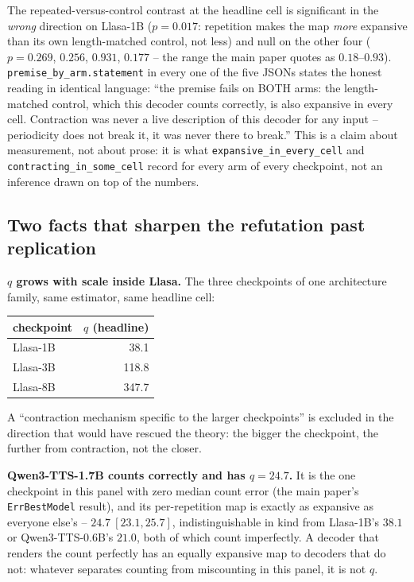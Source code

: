 \documentclass[11pt]{article}
\begin{document}
The repeated-versus-control contrast at the headline cell is significant in
the \emph{wrong} direction on Llasa-1B ($p=0.017$: repetition makes the map
\emph{more} expansive than its own length-matched control, not less) and null
on the other four ($p=0.269$, $0.256$, $0.931$, $0.177$ -- the range the main
paper quotes as $0.18$--$0.93$). \texttt{premise\_by\_arm.statement} in every
one of the five JSONs states the honest reading in identical language: ``the
premise fails on BOTH arms: the length-matched control, which this decoder
counts correctly, is also expansive in every cell. Contraction was never a
live description of this decoder for any input -- periodicity does not break
it, it was never there to break.'' This is a claim about measurement, not
about prose: it is what \texttt{expansive\_in\_every\_cell} and
\texttt{contracting\_in\_some\_cell} record for every arm of every checkpoint,
not an inference drawn on top of the numbers.

\subsection{Two facts that sharpen the refutation past replication}
\label{sec:s5-jacobian-scale}

\noindent\textbf{$q$ grows with scale inside Llasa.} The three checkpoints of
one architecture family, same estimator, same headline cell:

\begin{center}
\begin{tabular}{lr}
\toprule
checkpoint & $q$ (headline) \\
\midrule
Llasa-1B & 38.1 \\
Llasa-3B & 118.8 \\
Llasa-8B & 347.7 \\
\bottomrule
\end{tabular}
\end{center}

A ``contraction mechanism specific to the larger checkpoints'' is excluded in
the direction that would have rescued the theory: the bigger the checkpoint,
the further from contraction, not the closer.

\noindent\textbf{Qwen3-TTS-1.7B counts correctly and has $q=24.7$.} It is the
one checkpoint in this panel with zero median count error (the main paper's
\texttt{ErrBestModel} result), and its per-repetition map is exactly as
expansive as everyone else's -- $24.7\ [23.1,25.7]$, indistinguishable in kind
from Llasa-1B's $38.1$ or Qwen3-TTS-0.6B's $21.0$, both of which count
imperfectly. A decoder that renders the count perfectly has an equally
expansive map to decoders that do not: whatever separates counting from
miscounting in this panel, it is not $q$.
\end{document}
